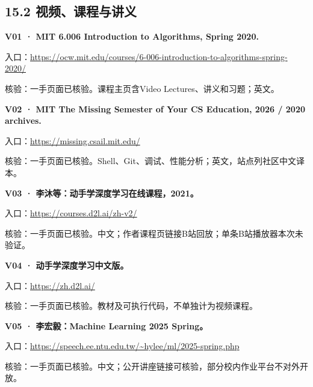 \subsection{15.2
视频、课程与讲义}\label{ux89c6ux9891ux8bfeux7a0bux4e0eux8bb2ux4e49}

\par\noindent\begin{minipage}{\linewidth}
\textbf{V01 · MIT 6.006 Introduction to Algorithms, Spring 2020.}

入口：\url{https://ocw.mit.edu/courses/6-006-introduction-to-algorithms-spring-2020/}

核验：一手页面已核验。课程主页含Video Lectures、讲义和习题；英文。
\end{minipage}\par\vspace{6pt}

\par\noindent\begin{minipage}{\linewidth}
\textbf{V02 · MIT The Missing Semester of Your CS Education, 2026 / 2020
archives.}

入口：\url{https://missing.csail.mit.edu/}

核验：一手页面已核验。Shell、Git、调试、性能分析；英文，站点列社区中文译本。
\end{minipage}\par\vspace{6pt}

\par\noindent\begin{minipage}{\linewidth}
\textbf{V03 · 李沐等：动手学深度学习在线课程，2021。}

入口：\url{https://courses.d2l.ai/zh-v2/}

核验：一手页面已核验。中文；作者课程页链接B站回放；单条B站播放器本次未验证。
\end{minipage}\par\vspace{6pt}

\par\noindent\begin{minipage}{\linewidth}
\textbf{V04 · 动手学深度学习中文版。}

入口：\url{https://zh.d2l.ai/}

核验：一手页面已核验。教材及可执行代码，不单独计为视频课程。
\end{minipage}\par\vspace{6pt}

\par\noindent\begin{minipage}{\linewidth}
\textbf{V05 · 李宏毅：Machine Learning 2025 Spring。}

入口：\url{https://speech.ee.ntu.edu.tw/~hylee/ml/2025-spring.php}

核验：一手页面已核验。中文；公开讲座链接可核验，部分校内作业平台不对外开放。
\end{minipage}\par\vspace{6pt}

